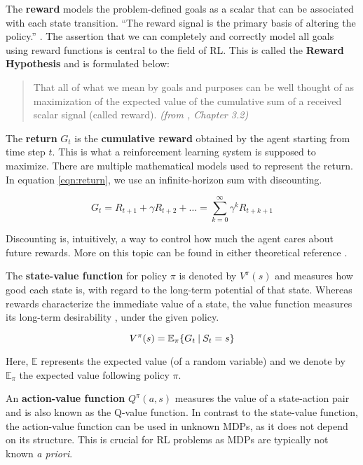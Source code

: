 The \textbf{reward} models the problem-defined goals as a scalar that can be associated with each state transition.
``The reward signal is the primary basis of altering the policy.'' \cite{rlai}.
The assertion that we can completely and correctly model all goals using reward functions is central to the field of RL.
This is called the \textbf{Reward Hypothesis} and is formulated below:
\begin{quotation}
    That all of what we mean by goals and purposes can be well thought of as maximization of the expected value of the cumulative sum of a received scalar signal (called reward). \textit{(from \cite{rlai}, Chapter 3.2)}
\end{quotation}

The \textbf{return} \(G_t\) is the \textbf{cumulative reward} obtained by the agent starting from time step \(t\).
This is what a reinforcement learning system is supposed to maximize.
There are multiple mathematical models used to represent the return.
In equation \ref{eqn:return}, we use an infinite-horizon sum with discounting.

\begin{equation} \label{eqn:return}
    G_t = R_{t+1} + \gamma R_{t+2} + \dots = \sum_{k = 0}^{\infty}{\gamma^{k} R_{t + k + 1}}    
\end{equation}

Discounting is, intuitively, a way to control how much the agent cares about future rewards.
More on this topic can be found in either theoretical reference \cite{rlai, silver-lectures}.

\label{rl:value-func}
The \textbf{state-value function} for policy \(\pi\) is denoted by \(V^{\pi}(s)\) and measures how good each state is, with regard to the long-term potential of that state.
Whereas rewards characterize the immediate value of a state, the value function measures its long-term desirability \cite{rlai}, under the given policy.

\begin{equation} \label{eqn:value}
    V^{\pi}(s) = \mathbb{E}_{\pi}\{ G_t \:\vert\: S_t = s \}
\end{equation}

Here, \(\mathbb{E}\) represents the expected value (of a random variable) and we denote by \(\mathbb{E}_{\pi}\) the expected value following policy \(\pi\).

An \textbf{action-value function} \(Q^{\pi}(a, s)\) measures the value of a state-action pair and is also known as the Q-value function.
In contrast to the state-value function, the action-value function can be used in unknown MDPs, as it does not depend on its structure.
This is crucial for RL problems as MDPs are typically not known \emph{a priori}.

